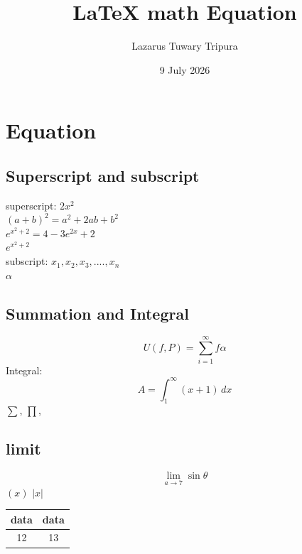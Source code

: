 \documentclass{article}
\title{\LaTeX \text{} math Equation}
\author{Lazarus Tuwary Tripura}
\date{9 July 2026}
\begin{document}
\maketitle 

\section{Equation}
\subsection{Superscript and subscript}
\begin{center}
superscript:
    $2x^2$\\
$(a+b)^2 = a^2 + 2ab + b^2 $ \\
$e^{x^2+2} = 4-3e^{2x}+2$ \\%
$e^{x^2+2}$ \\
subscript:
$x_1, x_2, x_3,...., x_n$\\
$\alpha$
\end{center}
\subsection{Summation and Integral}
\begin{equation}
    U(f,P) = \sum_{i=1}^{\infty} f\alpha
\end{equation}
Integral:\\
\begin{equation}
    A = \int_{1}^{\infty}(x+1)\,dx
\end{equation}
$\sum$, $\prod$, 
\subsection{limit}
\begin{equation}
    \lim_{a\to 7} \sin\theta
\end{equation}
$(x)$ $|x|$ \\
\begin{center}
    \begin{tabular}{|c|c|} %
\hline
    data & data  \\
    \hline
    12 & 13\\
    \hline
\end{tabular}
\end{center}
\end{document}
